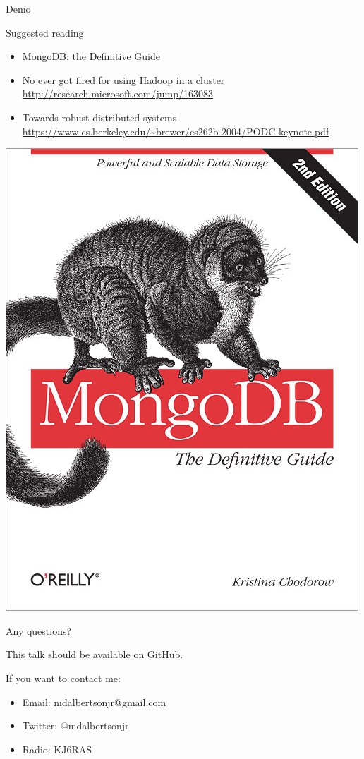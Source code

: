 \documentclass{beamer}
\begin{document}
\begin{frame}

\begin{center}
   Demo
\end{center}

\end{frame}


\begin{frame}{Suggested reading}

\begin{itemize}
\item MongoDB: the Definitive Guide
\item No ever got fired for using Hadoop in a cluster \url{http://research.microsoft.com/jump/163083}
\item Towards robust distributed systems \url{https://www.cs.berkeley.edu/~brewer/cs262b-2004/PODC-keynote.pdf}
\end{itemize}

\begin{center}
\includegraphics[scale=0.75]{mongo-cover.jpg}
\end{center}

\end{frame}


\begin{frame} %

\begin{center}
   Any questions?
\end{center}

This talk should be available on GitHub.

If you want to contact me:
\begin{itemize}
\item Email: mdalbertsonjr@gmail.com
\item Twitter: @mdalbertsonjr
\item Radio: KJ6RAS
\end{itemize}

\end{frame}
\end{document}
